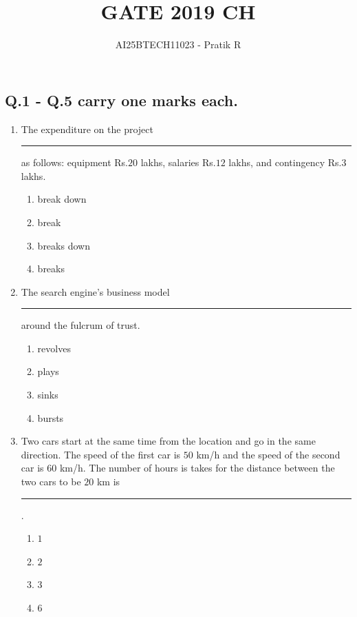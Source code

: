 \documentclass[journal]{IEEEtran}
\title{GATE 2019 CH}
\author{AI25BTECH11023 - Pratik R}
\begin{document}

\onecolumn

\maketitle
\bigskip
\renewcommand{\thefigure}{\theenumi}
\renewcommand{\thetable}{\theenumi}
\subsection*{\textbf{Q.1 - Q.5 carry one marks each.}}

\begin{enumerate}
    \item The expenditure on the project \rule{1cm}{0.1mm} as follows: equipment Rs.$20$ lakhs, salaries Rs.$12$ lakhs, and contingency Rs.$3$ lakhs.
\begin{multicols}{4}
    \begin{enumerate}
        \item break down
        \item break
        \item breaks down
        \item breaks
    \end{enumerate}
\end{multicols}

    \item The search engine's business model \rule{1.5cm}{0.1mm} around the fulcrum of trust.
\begin{multicols}{4}
    \begin{enumerate}
        \item revolves
        \item plays
        \item sinks
        \item bursts
    \end{enumerate}
\end{multicols}

    \item Two cars start at the same time from the location and go in the same direction. The speed of the first car is $50$ km/h and the speed of the second car is $60$ km/h. The number of hours is takes for the distance between the two cars to be $20$ km is \rule{1cm}{0.1mm}.
\begin{multicols}{4}
    \begin{enumerate}
        \item $1$
        \item $2$
        \item $3$
        \item $6$
    \end{enumerate}
\end{multicols}


\end{enumerate}
\end{document}
